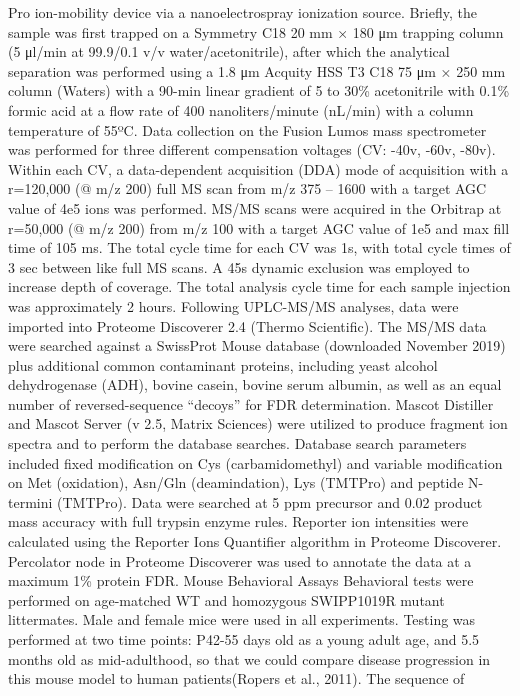 Pro ion-mobility device via a nanoelectrospray ionization source. Briefly, the
sample was first trapped on a Symmetry C18 20 mm × 180 μm trapping column (5
μl/min at 99.9/0.1 v/v water/acetonitrile), after which the analytical
separation was performed using a 1.8 μm Acquity HSS T3 C18 75 μm × 250 mm column
(Waters) with a 90-min linear gradient of 5 to 30\% acetonitrile with 0.1\% formic
acid at a flow rate of 400 nanoliters/minute (nL/min) with a column temperature
of 55ºC. Data collection on the Fusion Lumos mass spectrometer was performed for
three different compensation voltages (CV: -40v, -60v, -80v). Within each CV, a
data-dependent acquisition (DDA) mode of acquisition with a r=120,000 (@ m/z
200) full MS scan from m/z 375 – 1600 with a target AGC value of 4e5 ions was
performed. MS/MS scans were acquired in the Orbitrap at r=50,000 (@ m/z 200)
from m/z 100 with a target AGC value of 1e5 and max fill time of 105 ms. The
total cycle time for each CV was 1s, with total cycle times of 3 sec between
like full MS scans. A 45s dynamic exclusion was employed to increase depth of
coverage. The total analysis cycle time for each sample injection was
approximately 2 hours.
Following UPLC-MS/MS analyses, data were imported into Proteome Discoverer 2.4
(Thermo Scientific). The MS/MS data were searched against a SwissProt Mouse
database (downloaded November 2019) plus additional common contaminant proteins,
including yeast alcohol dehydrogenase (ADH), bovine casein, bovine serum
albumin, as well as an equal number of reversed-sequence “decoys” for FDR
determination. Mascot Distiller and Mascot Server (v 2.5, Matrix Sciences) were
utilized to produce fragment ion spectra and to perform the database searches.
Database search parameters included fixed modification on Cys (carbamidomethyl)
and variable modification on Met (oxidation), Asn/Gln (deamindation), Lys
(TMTPro) and peptide N-termini (TMTPro). Data were searched at 5 ppm precursor
and 0.02 product mass accuracy with full trypsin enzyme rules. Reporter ion
intensities were calculated using the Reporter Ions Quantifier algorithm in
Proteome Discoverer. Percolator node in Proteome Discoverer was used to annotate
the data at a maximum 1\% protein FDR.
Mouse Behavioral Assays
Behavioral tests were performed on age-matched WT and homozygous SWIPP1019R
mutant littermates. Male and female mice were used in all experiments. Testing
was performed at two time points: P42-55 days old as a young adult age, and 5.5
months old as mid-adulthood, so that we could compare disease progression in
this mouse model to human patients(Ropers et al., 2011). The sequence of
